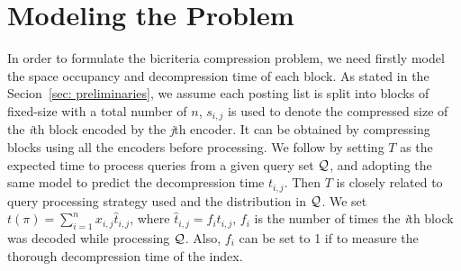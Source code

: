 \documentclass{sig-alternate-05-2015}
\begin{document}

\section{Modeling the Problem}\label{sec: model}
In order to formulate the bicriteria compression problem, we need firstly model the space occupancy and decompression time of each block.
As stated in the Secion~\ref{sec: preliminaries}, we assume each posting list is split into blocks of fixed-size with a total number of $ n $, $ s_{i,j} $ is used to denote the compressed size of the \textit{i}th block encoded by the \textit{j}th encoder.
It can be obtained by compressing blocks using all the encoders before processing.
We follow \cite{ottaviano2015optimal} by setting $ T $ as the expected time to process queries from a given query set $ \cal Q $, and adopting the same model to predict the decompression time $ t_{i,j} $.
Then $ T $ is closely related to query processing strategy used and the distribution in $ \cal Q $.
We set $ t(\pi) = \sum_{i=1}^{n}x_{i,j}\hat{t}_{i,j} $, where $ \hat{t}_{i,j}=f_i t_{i,j} $, $ f_i $ is the number of times the \textit{i}th block was decoded while processing $ \cal Q $.
Also, $ f_i $ can be set to 1 if to measure the thorough decompression time of the index.
\end{document}
